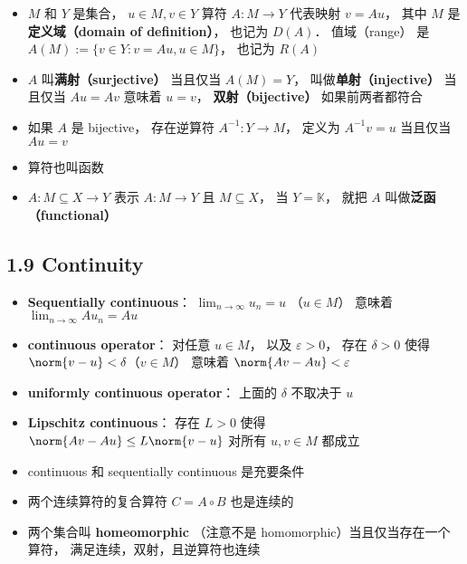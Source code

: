 \begin{itemize}
\item $M$ 和 $Y$ 是集合， $u \in M, v \in Y$ 算符 $A: M \to Y$ 代表映射 $v = Au$， 其中 $M$ 是\textbf{定义域（domain of definition）}， 也记为 $D(A)$． 值域（range） 是 $A(M) := \{v \in Y: v = Au, u \in M\}$， 也记为 $R(A)$

\item $A$ 叫\textbf{满射（surjective）} 当且仅当 $A(M) = Y$， 叫做\textbf{单射（injective）} 当且仅当 $Au = Av$ 意味着 $u = v$， \textbf{双射（bijective）} 如果前两者都符合

\item 如果 $A$ 是 bijective， 存在逆算符 $A^{-1}: Y \to M$， 定义为 $A^{-1} v = u$ 当且仅当 $Au = v$


\item 算符也叫函数

\item $A: M \subseteq X \to Y$ 表示 $A: M \to Y$ 且 $M \subseteq X$， 当 $Y = \mathbb K$， 就把 $A$ 叫做\textbf{泛函（functional）}
\end{itemize}

\subsection{1.9 Continuity}
\begin{itemize}
\item \textbf{Sequentially continuous}： $\lim_{n\to\infty} u_n = u$ （$u\in M$） 意味着 $\lim_{n\to\infty} Au_n = Au$

\item \textbf{continuous operator}： 对任意 $u\in M$， 以及 $\varepsilon>0$， 存在 $\delta >0$ 使得 $\norm{v-u}<\delta$（$v\in M$） 意味着 $\norm{Av-Au}<\varepsilon$

\item \textbf{uniformly continuous operator}： 上面的 $\delta$ 不取决于 $u$

\item \textbf{Lipschitz continuous}： 存在 $L > 0$ 使得 $\norm{Av-Au} \le L\norm{v-u}$ 对所有 $u,v \in M$ 都成立

\item continuous 和 sequentially continuous 是充要条件

\item 两个连续算符的复合算符 $C =  A \circ B$ 也是连续的

\item 两个集合叫 \textbf{homeomorphic} （注意不是 homomorphic）当且仅当存在一个算符， 满足连续，双射，且逆算符也连续
\end{itemize}

